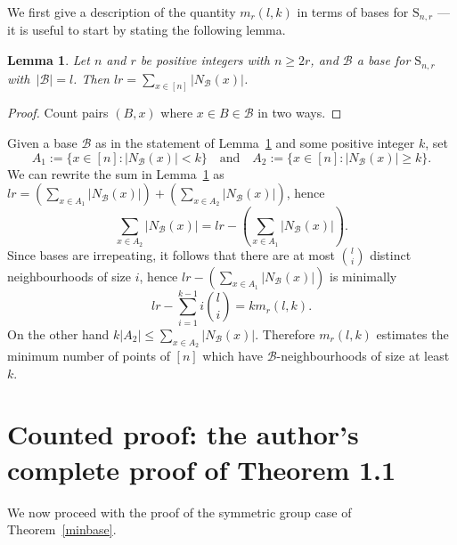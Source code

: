 \documentclass[10pt,a4paper]{amsart}
\renewcommand\S{\mathrm{S}}
\theoremstyle{plain}
\newtheorem{lemma}[cdrthm]{Lemma}
\theoremstyle{definition}
\theoremstyle{remark}
\begin{document}
We first give a description of the quantity $m_r(l,k)$ in terms of bases for $\S_{n,r}$ --- it is useful to start by stating the following lemma.

\begin{lemma}\label{doubcount}
Let $n$ and $r$ be positive integers with $n\geq 2r$, and $\mathcal{B}$ a base for $\S_{n,r}$ with~$|\mathcal{B}|=l$. Then $lr=\sum_{x\in [n]}|N_{\mathcal{B}}(x)|$.
\end{lemma}

\begin{proof}
Count pairs $(B,x)$ where $x\in B\in\mathcal{B}$ in two ways.
\end{proof}

Given a base $\mathcal{B}$ as in the statement of Lemma~\ref{doubcount} and some positive integer $k$, set $$A_1:=\{x\in [n] : |N_{\mathcal{B}}(x)|< k\} \quad\text{and}\quad A_2:=\{x\in [n] : |N_{\mathcal{B}}(x)|\geq k\}.$$ We can rewrite the sum in Lemma~\ref{doubcount} as $lr=\left(\sum_{x\in A_1}|N_{\mathcal{B}}(x)|\right)+\left(\sum_{x\in A_2}|N_{\mathcal{B}}(x)|\right)$, hence $$\sum_{x\in A_2}|N_{\mathcal{B}}(x)|=lr-\left(\sum_{x\in A_1}|N_{\mathcal{B}}(x)|\right).$$ Since bases are irrepeating, it follows that there are at most $\binom{l}{i}$ distinct neighbourhoods of size $i$, hence $lr-\left(\sum_{x\in A_1}|N_{\mathcal{B}}(x)|\right)$ is minimally $$lr-\sum_{i=1}^{k-1}i\binom{l}{i}=km_r(l,k).$$ On the other hand $k|A_2|\leq\sum_{x\in A_2}|N_{\mathcal{B}}(x)|$. Therefore $m_r(l,k)$ estimates the minimum number of points of $[n]$ which have $\mathcal{B}$-neighbourhoods of size at least $k$.


\section*{Counted proof: the author's complete proof of Theorem 1.1}
We now proceed with the proof of the symmetric group case of Theorem~\ref{minbase}.
\end{document}
